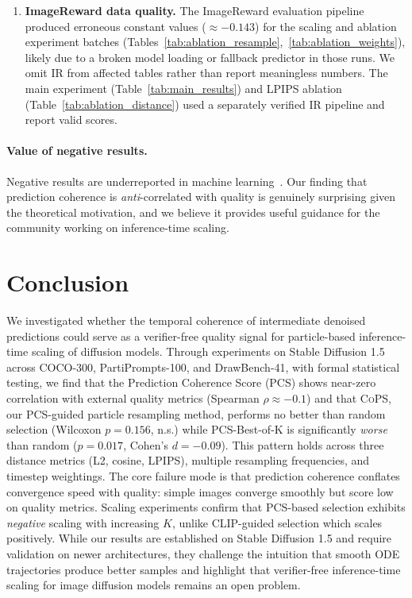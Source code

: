 \documentclass{article}
\newcommand{\cops}{\textsc{CoPS}}
\newcommand{\pcs}{\textsc{PCS}}
\begin{document}
\begin{enumerate}
    \item \textbf{ImageReward data quality.} The ImageReward evaluation pipeline produced erroneous constant values ($\approx -0.143$) for the scaling and ablation experiment batches (Tables~\ref{tab:ablation_resample},~\ref{tab:ablation_weights}), likely due to a broken model loading or fallback predictor in those runs. We omit IR from affected tables rather than report meaningless numbers. The main experiment (Table~\ref{tab:main_results}) and LPIPS ablation (Table~\ref{tab:ablation_distance}) used a separately verified IR pipeline and report valid scores.
\end{enumerate}

\paragraph{Value of negative results.} Negative results are underreported in machine learning~\citep{matosin2014negative}. Our finding that prediction coherence is \emph{anti}-correlated with quality is genuinely surprising given the theoretical motivation, and we believe it provides useful guidance for the community working on inference-time scaling.

\section{Conclusion}
\label{sec:conclusion}

We investigated whether the temporal coherence of intermediate denoised predictions could serve as a verifier-free quality signal for particle-based inference-time scaling of diffusion models. Through experiments on Stable Diffusion 1.5 across COCO-300, PartiPrompts-100, and DrawBench-41, with formal statistical testing, we find that the Prediction Coherence Score (\pcs{}) shows near-zero correlation with external quality metrics (Spearman $\rho \approx -0.1$) and that \cops{}, our \pcs{}-guided particle resampling method, performs no better than random selection (Wilcoxon $p = 0.156$, n.s.) while PCS-Best-of-K is significantly \emph{worse} than random ($p = 0.017$, Cohen's $d = -0.09$). This pattern holds across three distance metrics (L2, cosine, LPIPS), multiple resampling frequencies, and timestep weightings. The core failure mode is that prediction coherence conflates convergence speed with quality: simple images converge smoothly but score low on quality metrics. Scaling experiments confirm that \pcs{}-based selection exhibits \emph{negative} scaling with increasing $K$, unlike CLIP-guided selection which scales positively. While our results are established on Stable Diffusion 1.5 and require validation on newer architectures, they challenge the intuition that smooth ODE trajectories produce better samples and highlight that verifier-free inference-time scaling for image diffusion models remains an open problem.
\end{document}
